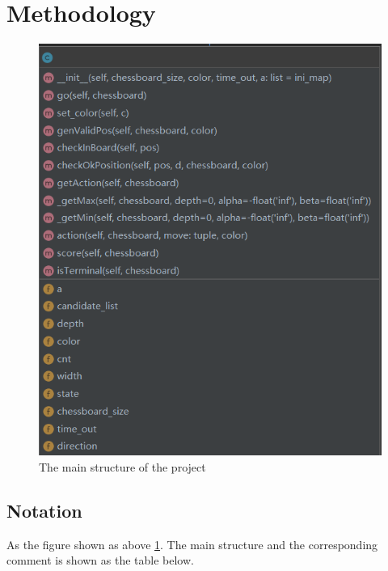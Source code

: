 \documentclass[conference,compsoc]{IEEEtran}
\begin{document}

\section{Methodology}
\begin{figure}[htbp]
\begin{center}
\includegraphics[width=.4\textwidth]{fig/structure.png}
\end{center}
\caption{The main structure of the project}
\label{Fig2}
\end{figure}
\subsection{Notation}
As the figure shown as above \ref{Fig2}. The main structure and the corresponding comment is shown as the table below.
\end{document}
